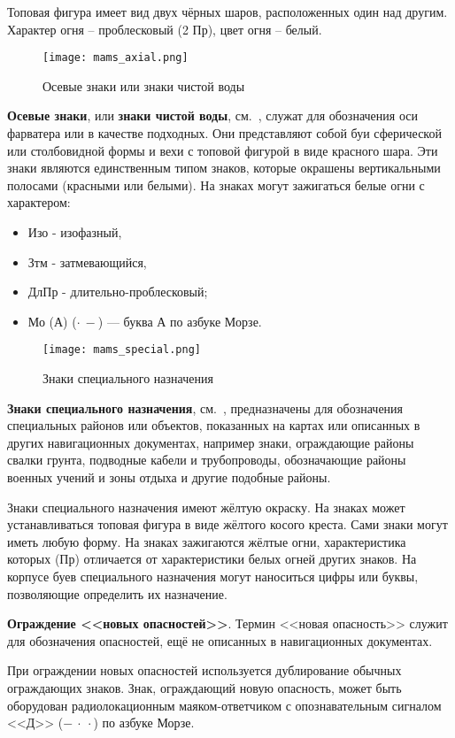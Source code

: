 Топовая фигура имеет вид двух чёрных шаров, расположенных один над
другим. Характер огня \--- проблесковый (2 Пр), цвет огня \--- белый.

\begin{figure}[!htb]
  \centering{}
  \texttt{[image: mams\_axial.png]}
  \caption[Осевые знаки]{Осевые знаки или знаки чистой воды}
  \label{fig:mams-axial}
\end{figure}

\textbf{Осевые знаки}, или \textbf{знаки чистой воды},
см.~, служат для обозначения оси фарватера или в
качестве подходных. Они представляют собой буи сферической или
столбовидной формы и вехи с топовой фигурой в виде красного шара. Эти
знаки являются единственным типом знаков, которые окрашены
вертикальными полосами (красными или белыми).  На знаках могут
зажигаться белые огни с характером:
\begin{itemize}
\item Изо - изофазный,
\item Зтм - затмевающийся,
\item ДлПр - длительно-проблесковый;
\item Мо (А) ($\cdot\ -$) — буква А по азбуке Морзе.
\end{itemize}

\begin{figure}[!htb]
  \centering{}
  \texttt{[image: mams\_special.png]}
  \caption{Знаки специального назначения}
  \label{fig:mams-special}
\end{figure}

\textbf{Знаки специального назначения}, см.~,
предназначены для обозначения специальных районов или объектов,
показанных на картах или описанных в других навигационных документах,
например знаки, ограждающие районы свалки грунта, подводные кабели и
трубопроводы, обозначающие районы военных учений и зоны отдыха и
другие подобные районы.

Знаки специального назначения имеют жёлтую окраску. На знаках может
устанавливаться топовая фигура в виде жёлтого косого креста. Сами
знаки могут иметь любую форму. На знаках зажигаются жёлтые огни,
характеристика которых (Пр) отличается от характеристики белых огней
других знаков.  На корпусе буев специального назначения могут
наноситься цифры или буквы, позволяющие определить их назначение.

\textbf{Ограждение <<новых опасностей>>}.
Термин <<новая опасность>> служит для обозначения опасностей,
ещё не описанных в навигационных документах.

При ограждении новых опасностей используется дублирование обычных
ограждающих знаков. Знак, ограждающий новую опасность, может быть
оборудован радиолокационным маяком-ответчиком с опознавательным
сигналом <<Д>> ($-\ \cdot\ \cdot$) по азбуке Морзе.

\onecolumn

